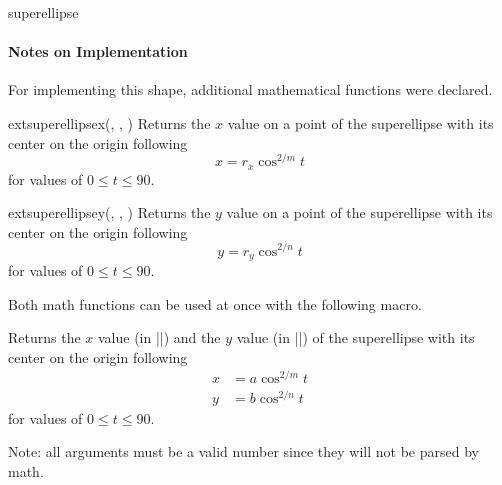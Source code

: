\begin{ext_shape}{superellipse}
\paragraph{Notes on Implementation}
For implementing this shape, additional mathematical functions were declared.
\begin{math-function}{extsuperellipsex(, , )}
\mathcommand
Returns the $x$ value on a point of the superellipse with its center on the origin following
\begin{equation*}
   x = r_x\cos^{2/m} t
\end{equation*}
for values of $0 \leq t \leq 90$.
\end{math-function}
\begin{math-function}{extsuperellipsey(, , )}
\mathcommand
Returns the $y$ value on a point of the superellipse with its center on the origin following
\begin{equation*}
   y = r_y\cos^{2/n} t
\end{equation*}
for values of $0 \leq t \leq 90$.
\end{math-function}

Both \pgfname math functions can be used at once with the following macro.
\begin{command}{\pgfextmathsuperellipseXY{}}
Returns the $x$ value (in |\pgfmathresultX|) and the $y$ value (in |\pgfmathresultY|) of the superellipse with its center on the origin following
\begin{align*}
   x & = a\cos^{2/m} t \\
   y & = b\cos^{2/n} t
\end{align*}
for values of $0 \leq t \leq 90$.

Note: all arguments must be a valid number since they will not be parsed by \pgfname math.
\end{command}


\end{ext_shape}
